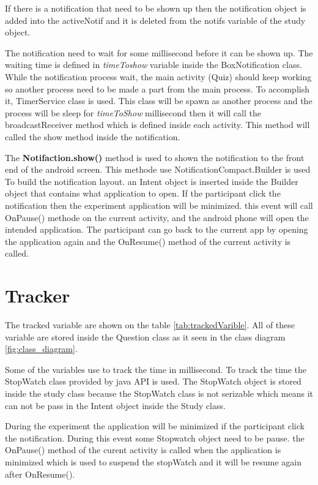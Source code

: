 If there  is a notification that need to be shown up then the notification object is added into the activeNotif and it is deleted from the notifs variable of the study object.

The notification need to wait for some millisecond before it can be shown up. The waiting time is defined in \textit{timeToshow} variable inside the BoxNotification class.
While the notification process wait, the main activity (Quiz) should keep working so another process need to be made a part from the main process. To accomplish it, TimerService class is used. This class will be spawn as another process and the process will be sleep for \textit{timeToShow} millisecond then it will call the broadcastReceiver method which is defined inside each activity.
This method will called  the show method inside the notification.

The \textbf{Notifaction.show()} method is used to shown the notification to the front end of the android screen. This methode use
 NotificationCompact.Builder is used To build the notification layout. an Intent object is inserted inside the Builder object that contains what application to open. If the participant click the notification then the experiment application will be minimized. this event will call OnPause() methode on the current activity, and the android phone will open the intended application. The participant can go back to the current app by opening the application again and the OnResume() method  of the current activity is called.


\section{Tracker}

The tracked variable are shown on the table \ref{tab:trackedVarible}. All of these variable are stored inside the Question class as it seen in the class diagram \ref{fig:class_diagram}.

Some of the variables use to track the time in millisecond. To track the time the StopWatch class provided by java API is used. The StopWatch object is stored inside the study class because the StopWatch class is not serizable which means it can not be pass in the Intent object inside the Study class.

During the experiment the application will be minimized if the participant click the notification. During this event some Stopwatch object need to be pause. the OnPause() method of the curent activity is called when the application is minimized which is used to suspend the stopWatch and it will be resume again after OnResume().


